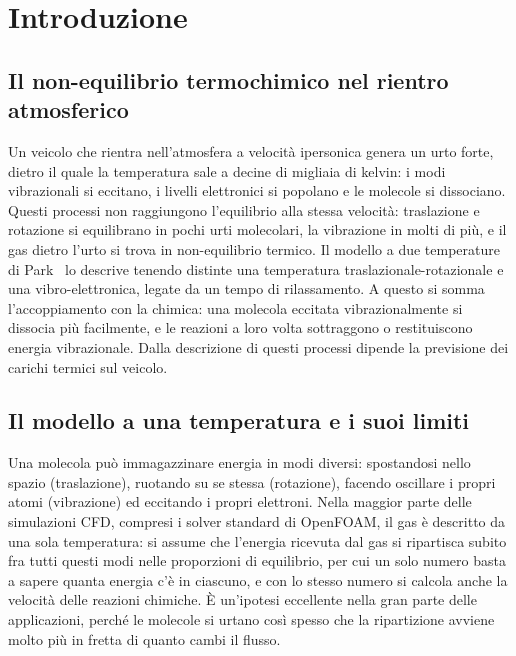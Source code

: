 \section{Introduzione}
\label{sec:introduzione}

\subsection{Il non-equilibrio termochimico nel rientro atmosferico}
\label{sec:contesto}

Un veicolo che rientra nell'atmosfera a velocità ipersonica genera un urto
forte, dietro il quale la temperatura sale a decine di migliaia di kelvin: i
modi vibrazionali si eccitano, i livelli elettronici si popolano e le molecole
si dissociano. Questi processi non raggiungono l'equilibrio alla stessa
velocità: traslazione e rotazione si equilibrano in pochi urti molecolari, la
vibrazione in molti di più, e il gas dietro l'urto si trova in non-equilibrio
termico. Il modello a due temperature di Park~\cite{park1990,park1993} lo
descrive tenendo distinte una temperatura traslazionale-rotazionale e una
vibro-elettronica, legate da un tempo di rilassamento. A questo si somma
l'accoppiamento con la chimica: una molecola eccitata vibrazionalmente si
dissocia più facilmente, e le reazioni a loro volta sottraggono o restituiscono
energia vibrazionale. Dalla descrizione di questi processi dipende la
previsione dei carichi termici sul veicolo.

\subsection{Il modello a una temperatura e i suoi limiti}
\label{sec:una-temperatura}

Una molecola può immagazzinare energia in modi diversi: spostandosi nello
spazio (traslazione), ruotando su se stessa (rotazione), facendo oscillare i
propri atomi (vibrazione) ed eccitando i propri elettroni. Nella maggior parte
delle simulazioni CFD, compresi i solver standard di OpenFOAM, il gas è
descritto da una sola temperatura: si assume che l'energia ricevuta dal gas si
ripartisca subito fra tutti questi modi nelle proporzioni di equilibrio, per
cui un solo numero basta a sapere quanta energia c'è in ciascuno, e con lo
stesso numero si calcola anche la velocità delle reazioni chimiche. È
un'ipotesi eccellente nella gran parte delle applicazioni, perché le molecole
si urtano così spesso che la ripartizione avviene molto più in fretta di
quanto cambi il flusso.

